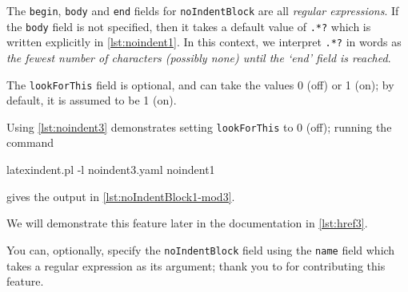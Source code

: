  The \texttt{begin}, \texttt{body} and \texttt{end} fields for \texttt{noIndentBlock} are
 all \emph{regular expressions}. If the \texttt{body} field is not specified, then it
 takes a default value of \lstinline!.*?! which is written explicitly in
 \cref{lst:noindent1}. In this context, we interpret \lstinline!.*?! in words as \emph{the
 fewest number of characters (possibly none) until the `end' field is reached}.

 The \texttt{lookForThis} field is optional, and can take the values 0 (off) or 1 (on); by
 default, it is assumed to be 1 (on).

 \begin{example}
 Using \cref{lst:noindent3} demonstrates setting \texttt{lookForThis} to 0 (off); running
 the command

 \begin{commandshell}
latexindent.pl -l noindent3.yaml noindent1
\end{commandshell}

 gives the output in \cref{lst:noIndentBlock1-mod3}.


 \end{example}

 We will demonstrate this feature later in the documentation in \cref{lst:href3}.

 You can, optionally, specify  the
 \texttt{noIndentBlock} field using the \texttt{name} field which takes a regular
 expression as its argument; thank you to \cite{XuehaiPan} for contributing this feature.

